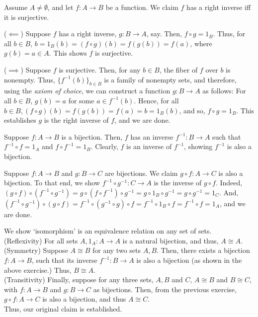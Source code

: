 \begin{xca}
Assume $A \neq \emptyset$, and let $f: A \to B$ be a function. We claim $f$ has
a right inverse iff it is surjective.

($\impliedby$) Suppose $f$ has a right inverse, $g: B \to A$, say. Then,
$f \circ g = 1_B$. Thus, for all $b \in B$, $b = 1_B(b) = (f \circ g)(b) =
f(g(b)) = f(a)$, where $g(b) = a \in A$. This shows $f$ is surjective.

($\implies$) Suppose $f$ is surjective. Then, for any $b \in B$, the fiber of
$f$ over $b$ is nonempty. Thus, $\{ f^{-1}(b) \}_{b \in B}$ is a family of
nonempty sets, and therefore, using the \emph{axiom of choice}, we can construct
a function $g : B \to A$ as follows: For all $b \in B$, $g(b) = a$ for some
$a \in f^{-1}(b)$. Hence, for all $b \in B, (f \circ g) (b) = f(g(b)) = f(a) =
b = 1_{B} (b)$, and so, $f \circ g = 1_B$. This establishes $g$ is the right
inverse of $f$, and we are done.
\end{xca}

\begin{xca}
Suppose $f : A \to B$ is a bijection. Then, $f$ has an inverse $f^{-1}: B \to A$
such that $f^{-1} \circ f = 1_A$ and $f \circ f^{-1} = 1_B$. Clearly, $f$ is an
inverse of $f^{-1}$, showing $f^{-1}$ is also a bijection.

Suppose $f: A \to B$ and $g: B \to C$ are bijections. We claim $g \circ f: A \to
C$ is also a bijection. To that end, we show $f^{-1} \circ g^{-1}: C \to A$ is
the inverse of $g \circ f$. Indeed, $(g \circ f) \circ (f^{-1} \circ g^{-1}) =
g \circ (f \circ f^{-1}) \circ g^{-1} = g \circ 1_B \circ g^{-1} = g \circ
g^{-1} = 1_C$. And, $(f^{-1} \circ g^{-1}) \circ (g \circ f) = f^{-1} \circ
(g^{-1} \circ g) \circ f = f^{-1} \circ 1_B \circ f = f^{-1} \circ f = 1_A$,
and we are done.
\end{xca}

\begin{xca}
We show `isomorphism' is an equivalence relation on any set of sets.\\
(Reflexivity) For all sets $A, 1_A : A \to A$ is a natural bijection, and thus,
$A \cong A$.\\
(Symmetry) Suppose $A \cong B$ for any two sets $A, B$. Then,
there exists a bijection $f : A \to B$, such that its inverse $f^{-1} : B \to
A$ is also a bijection (as shown in the above exercise.) Thus, $B \cong A$.\\
(Transitivity) Finally, suppose for any three sets, $A, B$ and $C$, $A \cong B$
and $B \cong C$, with $f : A \to B$ and $g: B \to C$ as bijections. Then, from
the previous exercise, $g \circ f : A \to C$ is also a bijection, and thus $A
\cong C$.\\
Thus, our original claim is established.
\end{xca}


